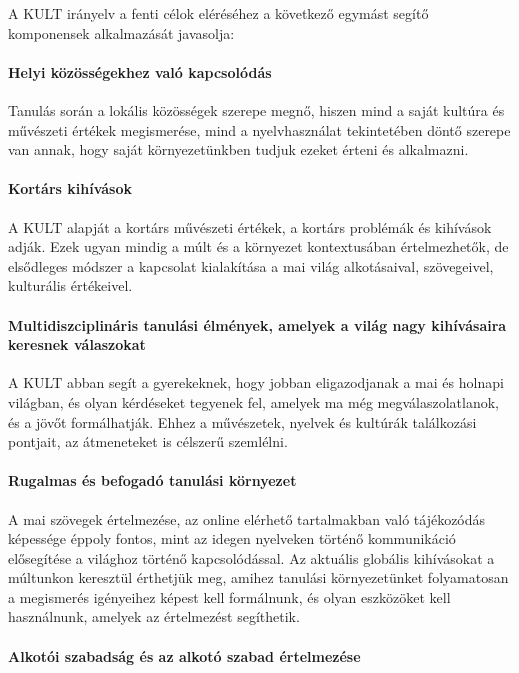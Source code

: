 A KULT irányelv a fenti célok eléréséhez a következő egymást segítő komponensek alkalmazását javasolja:

\paragraph{Helyi közösségekhez való kapcsolódás}

Tanulás során a lokális közösségek szerepe megnő, hiszen mind a saját kultúra és művészeti értékek megismerése, mind a nyelvhasználat tekintetében döntő szerepe van annak, hogy saját környezetünkben  tudjuk ezeket érteni és alkalmazni.

\paragraph{Kortárs kihívások}

A KULT alapját a kortárs művészeti értékek, a kortárs problémák és kihívások adják. Ezek ugyan mindig a múlt és a környezet kontextusában értelmezhetők, de elsődleges módszer a kapcsolat kialakítása a mai világ alkotásaival, szövegeivel, kulturális értékeivel.

\paragraph{Multidiszciplináris tanulási élmények, amelyek a világ nagy kihívásaira keresnek válaszokat}

A KULT abban segít a gyerekeknek, hogy jobban eligazodjanak a mai és holnapi világban, és olyan kérdéseket tegyenek fel, amelyek ma még megválaszolatlanok, és a jövőt formálhatják. Ehhez a művészetek, nyelvek és kultúrák találkozási pontjait, az átmeneteket is célszerű szemlélni.

\paragraph{Rugalmas és befogadó tanulási környezet}

A mai szövegek értelmezése, az online elérhető tartalmakban való tájékozódás képessége éppoly fontos, mint az idegen nyelveken történő kommunikáció elősegítése a világhoz történő kapcsolódással. Az aktuális globális kihívásokat a múltunkon keresztül érthetjük meg, amihez tanulási környezetünket folyamatosan a megismerés igényeihez képest kell formálnunk, és olyan eszközöket kell használnunk, amelyek az értelmezést segíthetik.

\paragraph{Alkotói szabadság és az alkotó szabad értelmezése}

